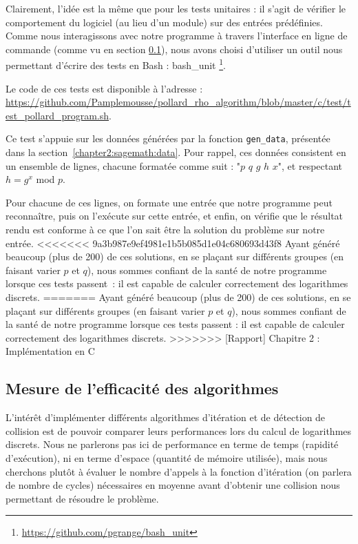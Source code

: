       Clairement, l'idée est la même que pour les tests unitaires : il s'agit de vérifier le comportement du logiciel (au lieu d'un module) sur des entrées prédéfinies. Comme nous interagissons avec notre programme à travers l'interface en ligne de commande (comme vu en section \ref{}), nous avons choisi d'utiliser un outil nous permettant d'écrire des tests en Bash : bash\_unit \footnote{\url{https://github.com/pgrange/bash_unit}}.

      \begin{sloppypar}
        Le code de ces tests est disponible à l'adresse : \url{https://github.com/Pamplemousse/pollard_rho_algorithm/blob/master/c/test/test_pollard_program.sh}.
      \end{sloppypar}

      Ce test s'appuie sur les données générées par la fonction \lstinline{gen_data}, présentée dans la section~\ref{chapter2:sagemath:data}. Pour rappel, ces données consistent en un ensemble de lignes, chacune formatée comme suit : "$p$ $q$ $g$ $h$ $x$", et respectant $h = g^x$ mod $p$.

      Pour chacune de ces lignes, on formate une entrée que notre programme peut reconnaître, puis on l'exécute sur cette entrée, et enfin, on vérifie que le résultat rendu est conforme à ce que l'on sait être la solution du problème sur notre entrée.
<<<<<<< 9a3b987e9ef4981e1b5b085d1e04c680693d43f8
      Ayant généré beaucoup (plus de 200) de ces solutions, en se plaçant sur différents groupes (en faisant varier $p$ et $q$), nous sommes confiant de la santé de notre programme lorsque ces tests passent~: il est capable de calculer correctement des logarithmes discrets.
=======
      Ayant généré beaucoup (plus de 200) de ces solutions, en se plaçant sur différents groupes (en faisant varier $p$ et $q$), nous sommes confiant de la santé de notre programme lorsque ces tests passent : il est capable de calculer correctement des logarithmes discrets.
>>>>>>> [Rapport] Chapitre 2 : Implémentation en C


      \subsection{Mesure de l'efficacité des algorithmes}
      L'intérêt d'implémenter différents algorithmes d'itération et de détection de collision est de pouvoir comparer leurs performances lors du calcul de logarithmes discrets. Nous ne parlerons pas ici de performance en terme de temps (rapidité d'exécution), ni en terme d'espace (quantité de mémoire utilisée), mais nous cherchons plutôt à évaluer le nombre d'appels à la fonction d'itération (on parlera de nombre de cycles) nécessaires en moyenne avant d'obtenir une collision nous permettant de résoudre le problème.

